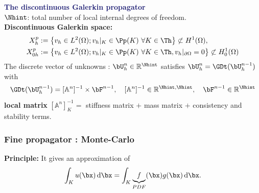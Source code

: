 \documentclass[aspectratio=169]{beamer}
\begin{document}
%
\begin{frame}
  \textcolor{midnightblue}{\textbf{The discontinuous Galerkin propagator}}
  \\
  \vspace*{0.2 cm}
  $\Nhint$:  total number of local internal degrees of freedom.
  \\
  \vspace*{0.2 cm}
  \textcolor{cadmiumgreen}{\textbf{Discontinuous Galerkin space:}}
  \begin{equation*}
    \begin{split}
      X_h^p & := \left\{v_h \in L^2(\Omega); v_h|_{K} \in \Pp(K) \ \forall K \in \Th  \right\} \not \subset H^1(\Omega),\\
X_{0h}^p & := \left\{v_h \in L^2(\Omega); v_h|_{K} \in \Pp(K) \ \forall K \in \Th, v_h|_{\partial \Omega} = 0  \right\} \not \subset H_0^1(\Omega)
    \end{split}
  \end{equation*}
  The discrete vector of unknowns : $\bU_h^n \in \mathbb{R}^{\Nhint}$ satisfies $\bU_h^n = \GDt(\bU_h^{n-1})$ with
  \begin{equation*}
    \GDt(\bU_h^{n-1}) = [\mathbb{A}^n]^{-1}  \times \bF^{n-1}, \quad [\mathbb{A}^n]^{-1} \in \mathbb{R}^{\Nhint,\Nhint}, \quad \bF^{n-1} \in \mathbb{R}^{\Nhint}
  \end{equation*}
  \textcolor{cadmiumgreen}{\textbf{local matrix}} $[\mathbb{A}^n]^{-1}_K = $ stiffness matrix $+$ mass matrix $+$ consistency and stability terms.
\end{frame}
%
\begin{frame}
  \frametitle{Fine propagator : Monte-Carlo}
  \textcolor{cadmiumgreen}{\textbf{Principle:}}
  It gives an approximation of
  \begin{equation*}
    \int_K u(\bx)\,\mathrm{d}\bx = \int_K \underbrace{f}_{PDF}(\bx) g(\bx)\,\mathrm{d}\bx.
  \end{equation*}
\end{frame}
\end{document}
